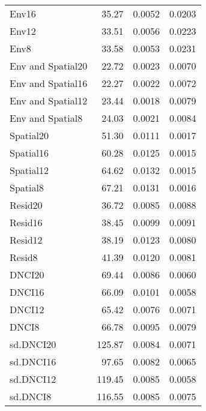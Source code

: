 \begin{longtable}{l|rrr}
		Env16 & 35.27 & 0.0052 & 0.0203 \\ 
		Env12 & 33.51 & 0.0056 & 0.0223 \\ 
		Env8 & 33.58 & 0.0053 & 0.0231 \\ 
		Env and Spatial20 & 22.72 & 0.0023 & 0.0070 \\ 
		Env and Spatial16 & 22.27 & 0.0022 & 0.0072 \\ 
		Env and Spatial12 & 23.44 & 0.0018 & 0.0079 \\ 
		Env and Spatial8 & 24.03 & 0.0021 & 0.0084 \\ 
		Spatial20 & 51.30 & 0.0111 & 0.0017 \\ 
		Spatial16 & 60.28 & 0.0125 & 0.0015 \\ 
		Spatial12 & 64.62 & 0.0132 & 0.0015 \\ 
		Spatial8 & 67.21 & 0.0131 & 0.0016 \\ 
		Resid20 & 36.72 & 0.0085 & 0.0088 \\ 
		Resid16 & 38.45 & 0.0099 & 0.0091 \\ 
		Resid12 & 38.19 & 0.0123 & 0.0080 \\ 
		Resid8 & 41.39 & 0.0120 & 0.0081 \\ 
		DNCI20 & 69.44 & 0.0086 & 0.0060 \\ 
		DNCI16 & 66.09 & 0.0101 & 0.0058 \\ 
		DNCI12 & 65.42 & 0.0076 & 0.0071 \\ 
		DNCI8 & 66.78 & 0.0095 & 0.0079 \\ 
		sd.DNCI20 & 125.87 & 0.0084 & 0.0071 \\ 
		sd.DNCI16 & 97.65 & 0.0082 & 0.0065 \\ 
		sd.DNCI12 & 119.45 & 0.0085 & 0.0058 \\ 
		sd.DNCI8 & 116.55 & 0.0085 & 0.0075 \\ 
		\bottomrule
	\end{longtable}
	
	
	
